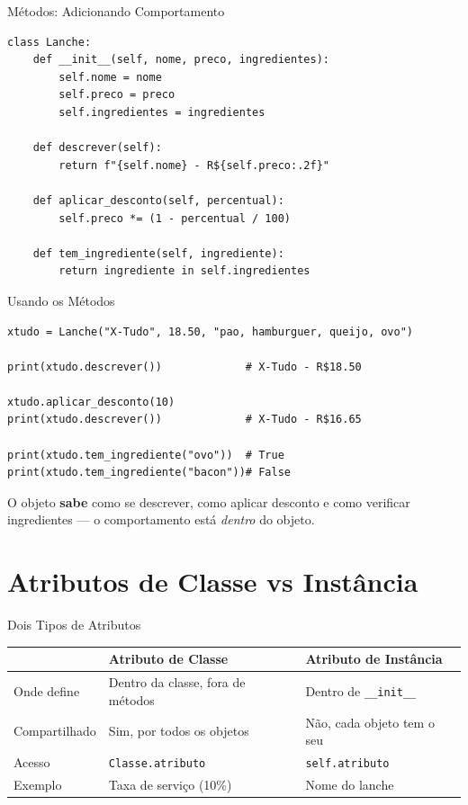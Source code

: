 \documentclass[aspectratio=169]{beamer}
\begin{document}
\begin{frame}[fragile]{Métodos: Adicionando Comportamento}
  \begin{lstlisting}
class Lanche:
    def __init__(self, nome, preco, ingredientes):
        self.nome = nome
        self.preco = preco
        self.ingredientes = ingredientes

    def descrever(self):
        return f"{self.nome} - R${self.preco:.2f}"

    def aplicar_desconto(self, percentual):
        self.preco *= (1 - percentual / 100)

    def tem_ingrediente(self, ingrediente):
        return ingrediente in self.ingredientes
  \end{lstlisting}
\end{frame}

\begin{frame}[fragile]{Usando os Métodos}
  \begin{lstlisting}
xtudo = Lanche("X-Tudo", 18.50, "pao, hamburguer, queijo, ovo")

print(xtudo.descrever())             # X-Tudo - R$18.50

xtudo.aplicar_desconto(10)
print(xtudo.descrever())             # X-Tudo - R$16.65

print(xtudo.tem_ingrediente("ovo"))  # True
print(xtudo.tem_ingrediente("bacon"))# False
  \end{lstlisting}

  \vspace{0.3cm}
  O objeto \textbf{sabe} como se descrever, como aplicar desconto
  e como verificar ingredientes --- o comportamento está \emph{dentro} do objeto.
\end{frame}

\section{Atributos de Classe vs Instância}

\begin{frame}{Dois Tipos de Atributos}
  \begin{table}
    \centering
    \small
    \begin{tabular}{lp{4.5cm}p{4.5cm}}
      \toprule
      & \textbf{Atributo de Classe} & \textbf{Atributo de Instância} \\
      \midrule
      Onde define  & Dentro da classe, fora de métodos & Dentro de \texttt{\_\_init\_\_} \\
      Compartilhado & Sim, por todos os objetos & Não, cada objeto tem o seu \\
      Acesso       & \texttt{Classe.atributo} & \texttt{self.atributo} \\
      Exemplo      & Taxa de serviço (10\%) & Nome do lanche \\
      \bottomrule
    \end{tabular}
  \end{table}
\end{frame}
\end{document}
